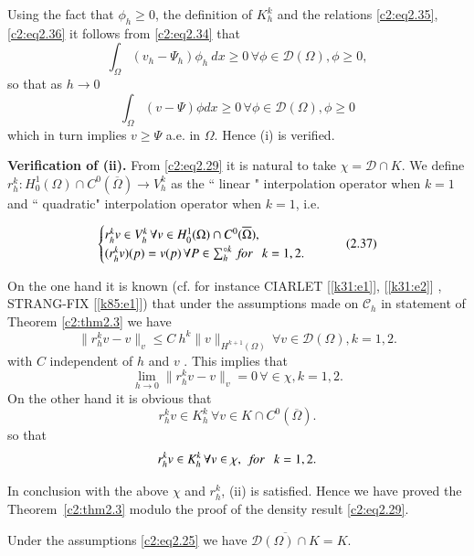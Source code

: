 Using the fact that $\phi_h \geq 0$, the definition of $K^k_h$ and the
relations \eqref{c2:eq2.35}, \eqref{c2:eq2.36} it follows from
\eqref{c2:eq2.34} that   
$$
\int_\Omega (v_h - \Psi_h) \phi_h ~dx \geq 0\, \forall  \phi \in
\mathscr{D} (\Omega), \phi\geq 0, 
$$
so that as $h \to 0$
$$
\int_\Omega (v - \Psi) \phi dx \geq 0\, \forall  \phi \in
\mathscr{D} (\Omega), \phi \geq 0 
$$
which in turn implies $v \geq \Psi $ a.e. in $\Omega$. Hence (i) is
verified. 

\medskip
\noindent \textbf{Verification of (ii).}%
From \eqref{c2:eq2.29} it is natural to take $\chi = \mathscr{D} \cap
K$. We define $r^k_h : H^1 _0 (\Omega) \cap C^0 (\overline{\Omega})
\to V^k_h$ as the `` linear " interpolation operator when $k = 1$ and
`` quadratic" interpolation operator when $k=1$, i.e. 

 \begin{equation}
\begin{cases}
r^k_h v \in V^k_h\, \forall  v \in H^1 _0 (\Omega) \cap C^0
(\overline{\Omega}),\\ 
(r^k_h v )(p) = v (p)\, \forall  P \in \sum^{\circ k}_h ~\text{\em
  for }~~ k=1, 2. 
\end{cases}\tag{2.37}\label{c2:eq2.37} 
\end{equation}
 
On the one hand it is known (cf. for instance CIARLET [\ref{k31:e1}],
[\ref{k31:e2}] ,
STRANG-FIX [\ref{k85:e1}]) that under the assumptions made on $\mathscr{C}_h$ in
statement of Theorem \ref{c2:thm2.3} we have  
$$
\parallel  r^k_h v-v \parallel_v \leq C~ h^k \parallel  v \parallel_{H^{k+1}(\Omega)}\, \forall  v
\in \mathscr{D} (\Omega), k=1, 2. 
$$
with $C$ independent of $h$ and $v$ . This implies that 
$$
\lim_{h \to 0} \parallel  r^k_h v - v \parallel  _v = 0\, \forall  \in \chi, k=1,
2. 
$$
On the other hand it is obvious that 
$$
r^k_{h}v \in K^k_h\, \forall  v \in K \cap C^0
(\overline{\Omega}). 
$$
so that\pageoriginale  
$$
r^k_h v \in K^k_h\, \forall  v \in \chi, ~~\text{\em for }~~
k=1, 2. 
$$
 
In conclusion with the above $\chi$ and $r^k_h$, (ii) is
satisfied. Hence we have proved the Theorem~\ref{c2:thm2.3} modulo the
proof of the density result \eqref{c2:eq2.29}. 
 
\begin{lemma}\label{c2:lem2.4}%
Under the assumptions \eqref{c2:eq2.25} we have
$\overline{\mathscr{D}(\Omega) \cap K} = K$. 
\end{lemma} 
 
